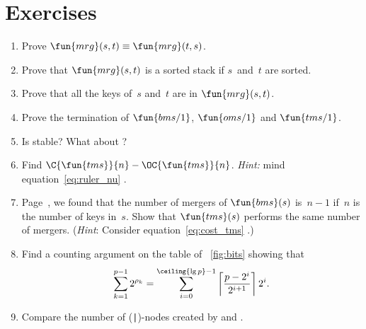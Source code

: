 \section*{Exercises}

\begin{enumerate}

  \item Prove \(\fun{mrg}(s,t) \equiv \fun{mrg}(t,s)\).

  \item Prove that \(\fun{mrg}(s,t)\) is a sorted
  stack if \(s\)~and~\(t\) are sorted.

  \item Prove that all the keys of~\(s\) and~\(t\) are in
  \(\fun{mrg}(s,t)\).

  \item Prove the termination of \(\fun{bms/1}\), \(\fun{oms/1}\) and
    \(\fun{tms/1}\).

  \item Is  stable? What about ?

  \item Find \(\C{\fun{tms}}{n} - \OC{\fun{tms}}{n}\). \emph{Hint:}
    mind equation~\eqref{eq:ruler_nu} .

  \item Page~\pageref{eq:bms_merges}, we found that the number of
    mergers of \(\fun{bms}(s)\) is~\(n-1\) if~\(n\) is the number of
    keys in~\(s\). Show that \(\fun{tms}(s)\) performs the same number
    of mergers. (\emph{Hint}: Consider equation~\eqref{eq:cost_tms}
    .)

  \item Find a counting argument on the table of \fig~\vref{fig:bits}
    showing that
    \begin{equation*}
      \sum_{k=1}^{p-1}{2^{\rho_k}}
      = \sum_{i=0}^{\ceiling{\lg p}-1}%
      {\left\lceil\frac{p-2^i}{2^{i+1}}\right\rceil 2^i}.
    \end{equation*}

  \item Compare the number of (\texttt{|})-nodes created by
     and .

\end{enumerate}
